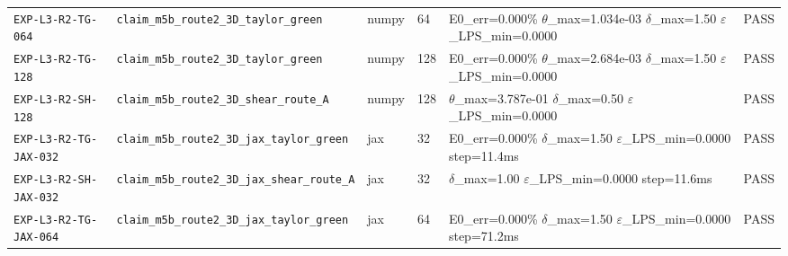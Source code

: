 {\begin{longtable}{@{}>{\raggedright\arraybackslash}p{} >{\raggedright\arraybackslash}p{} l l >{\raggedright\arraybackslash}p{} l@{}}
\texttt{EXP-\allowbreak{}L3-\allowbreak{}R2-\allowbreak{}TG-\allowbreak{}064} & \texttt{claim\_\allowbreak{}m5b\_\allowbreak{}route2\_\allowbreak{}3D\_\allowbreak{}taylor\_\allowbreak{}green} & numpy & 64 & E0\_\allowbreak{}err=\allowbreak{}0.000\%  $\theta$\_\allowbreak{}max=\allowbreak{}1.034e-03  $\delta$\_\allowbreak{}max=\allowbreak{}1.50  $\varepsilon$\_\allowbreak{}LPS\_\allowbreak{}min=\allowbreak{}0.0000 & \textsf{PASS}\\
\texttt{EXP-\allowbreak{}L3-\allowbreak{}R2-\allowbreak{}TG-\allowbreak{}128} & \texttt{claim\_\allowbreak{}m5b\_\allowbreak{}route2\_\allowbreak{}3D\_\allowbreak{}taylor\_\allowbreak{}green} & numpy & 128 & E0\_\allowbreak{}err=\allowbreak{}0.000\%  $\theta$\_\allowbreak{}max=\allowbreak{}2.684e-03  $\delta$\_\allowbreak{}max=\allowbreak{}1.50  $\varepsilon$\_\allowbreak{}LPS\_\allowbreak{}min=\allowbreak{}0.0000 & \textsf{PASS}\\
\texttt{EXP-\allowbreak{}L3-\allowbreak{}R2-\allowbreak{}SH-\allowbreak{}128} & \texttt{claim\_\allowbreak{}m5b\_\allowbreak{}route2\_\allowbreak{}3D\_\allowbreak{}shear\_\allowbreak{}route\_\allowbreak{}A} & numpy & 128 & $\theta$\_\allowbreak{}max=\allowbreak{}3.787e-01  $\delta$\_\allowbreak{}max=\allowbreak{}0.50  $\varepsilon$\_\allowbreak{}LPS\_\allowbreak{}min=\allowbreak{}0.0000 & \textsf{PASS}\\
\texttt{EXP-\allowbreak{}L3-\allowbreak{}R2-\allowbreak{}TG-\allowbreak{}JAX-\allowbreak{}032} & \texttt{claim\_\allowbreak{}m5b\_\allowbreak{}route2\_\allowbreak{}3D\_\allowbreak{}jax\_\allowbreak{}taylor\_\allowbreak{}green} & jax & 32 & E0\_\allowbreak{}err=\allowbreak{}0.000\%  $\delta$\_\allowbreak{}max=\allowbreak{}1.50  $\varepsilon$\_\allowbreak{}LPS\_\allowbreak{}min=\allowbreak{}0.0000  step=\allowbreak{}11.4ms & \textsf{PASS}\\
\texttt{EXP-\allowbreak{}L3-\allowbreak{}R2-\allowbreak{}SH-\allowbreak{}JAX-\allowbreak{}032} & \texttt{claim\_\allowbreak{}m5b\_\allowbreak{}route2\_\allowbreak{}3D\_\allowbreak{}jax\_\allowbreak{}shear\_\allowbreak{}route\_\allowbreak{}A} & jax & 32 & $\delta$\_\allowbreak{}max=\allowbreak{}1.00  $\varepsilon$\_\allowbreak{}LPS\_\allowbreak{}min=\allowbreak{}0.0000  step=\allowbreak{}11.6ms & \textsf{PASS}\\
\texttt{EXP-\allowbreak{}L3-\allowbreak{}R2-\allowbreak{}TG-\allowbreak{}JAX-\allowbreak{}064} & \texttt{claim\_\allowbreak{}m5b\_\allowbreak{}route2\_\allowbreak{}3D\_\allowbreak{}jax\_\allowbreak{}taylor\_\allowbreak{}green} & jax & 64 & E0\_\allowbreak{}err=\allowbreak{}0.000\%  $\delta$\_\allowbreak{}max=\allowbreak{}1.50  $\varepsilon$\_\allowbreak{}LPS\_\allowbreak{}min=\allowbreak{}0.0000  step=\allowbreak{}71.2ms & \textsf{PASS}\\

\end{longtable}}
